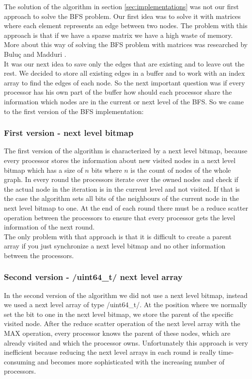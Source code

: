\documentclass[12pt,a4paper]{article}
\begin{document}
The solution of the algorithm in section \ref{sec:implementations} was not our first approach to solve the BFS problem. Our first idea was to solve it with matrices where each element represents an edge between two nodes. The problem with this approach is that if we have a sparse matrix we have a high waste of memory. More about this way of solving the BFS problem with matrices was researched by Buluç and Madduri \cite{matrices}.\\
It was our next idea to save only the edges that are existing and to leave out the rest. We decided to store all existing edges in a buffer and to work with an index array to find the edges of each node. So the next important question was if every processor has his own part of the buffer how should each processor share the information which nodes are in the current or next level of the BFS. So we came to the first version of the BFS implementation:

\subsubsection{First version - next level bitmap}
\label{sec:firstversion}

The first version of the algorithm is characterized by a next level bitmap, because every processor stores the information about new visited nodes in a next level bitmap which has a size of \(n\) bits where \(n\) is the count of nodes of the whole graph. In every round the processors iterate over the owned nodes and check if the actual node in the iteration is in the current level and not visited. If that is the case the algorithm sets all bits of the neighbours of the current node in the next level bitmap to one. At the end of each round there must be a reduce scatter operation between the processors to ensure that every processor gets the level information of the next round.\\
The only problem with that approach is that it is difficult to create a parent array if you just synchronize a next level bitmap and no other information between the processors.

\subsubsection{Second version - \cinline/uint64_t/ next level array}
\label{sec:secondversion}

In the second version of the algorithm we did not use a next level bitmap, instead we used a next level array of type \cinline/uint64_t/. At the position where we normally set the bit to one in the next level bitmap, we store the parent of the specific visited node. After the reduce scatter operation of the next level array with the MAX operation, every processor knows the parent of these nodes, which are already visited and which the processor owns. Unfortunately this approach is very inefficient because reducing the next level arrays in each round is really time-consuming and becomes more sophisticated with the increasing number of processors.
\end{document}
